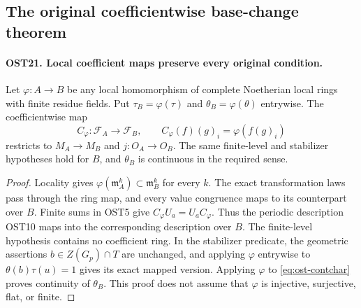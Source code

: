 \subsection{The original coefficientwise base-change theorem}

\paragraph{OST21. Local coefficient maps preserve every original condition.}
\label{claim:OST21}
Let $\varphi:A\to B$ be any local homomorphism of complete
Noetherian local rings with finite residue fields.  Put
$\tau_B=\varphi(\tau)$ and $\theta_B=\varphi(\theta)$
entrywise.  The coefficientwise map
\[
 C_\varphi:\mathcal F_A\longrightarrow\mathcal F_B,
                 \qquad C_\varphi(f)(g)_i=\varphi(f(g)_i)
\]
restricts to $M_A\to M_B$ and $j:O_A\to O_B$.
The same finite-level and stabilizer hypotheses hold for $B$,
and $\theta_B$ is continuous in the required sense.
\begin{proof}
Locality gives $\varphi(\mathfrak m_A^k)\subset\mathfrak m_B^k$
for every $k$.  The exact transformation laws pass through
the ring map, and every value congruence maps to its counterpart
over $B$.  Finite sums in OST5 give
$C_\varphi U_a=U_a C_\varphi$.  Thus the periodic description
OST10 maps into the corresponding description over $B$.
The finite-level hypothesis contains no coefficient ring.
In the stabilizer predicate, the geometric assertions
$b\in Z(G_p)\cap T$ are unchanged, and applying $\varphi$
entrywise to $\theta(b)\tau(u)=1$ gives its exact mapped
version.  Applying $\varphi$ to
\eqref{eq:ost-contchar} proves continuity of $\theta_B$.
This proof does not assume that $\varphi$ is injective,
surjective, flat, or finite.
\end{proof}

